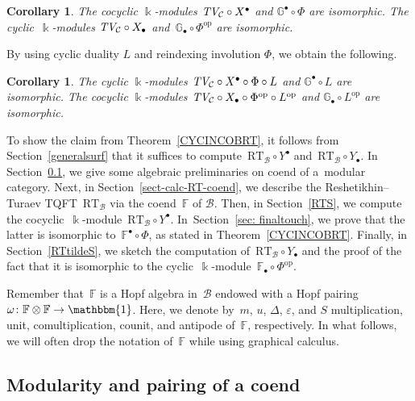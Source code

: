 \documentclass[10pt,a4paper]{amsart}
\numberwithin{equation}{section}
\newtheorem{Corollary}[Theorem]{Corollary}
\newcommand{\co}{\colon}
\newcommand{\mc}{\mathcal}
\newcommand{\opp}{\mathrm{op}}
\newcommand{\kk}{\Bbbk}
\newcommand{\uu}{\mathbbm{1}}
\newcommand{\RT}{\text{RT}}
\newcommand{\TV}{\text{TV}}
\newcommand{\coend}{\mathbb{F}}
\newcommand{\coendzc}{\mathbb{G}}
\begin{document}
\begin{Corollary}%
	The cocyclic $\kk$-modules $\emph{\TV}_{\mc C} \circ X^\bullet$ and $\coendzc^\bullet \circ \Phi$ are isomorphic. The cyclic~$\kk$-modules $\emph{\TV}_{\mc C} \circ X_\bullet$ and~$\coendzc_\bullet \circ \Phi^{\opp}$ are isomorphic.
\end{Corollary}
By using cyclic duality $L$ and reindexing involution $\Phi$, we obtain the following.

\begin{Corollary}
	The cyclic $\kk$-modules $\emph{\TV}_{\mc C} \circ X^\bullet \circ \Phi \circ L$ and $\coendzc^\bullet \circ L$ are isomorphic. The cocyclic $\kk$-modules $\emph{\TV}_{\mc C} \circ X_\bullet \circ \Phi^{\opp} \circ L^\opp$ and $\coendzc_\bullet \circ L^\opp$ are isomorphic.
\end{Corollary}

To show the claim from Theorem~\ref{CYCINCOBRT}, it follows from Section~\ref{generalsurf} that it suffices to compute~$\RT_\mc B\circ Y^\bullet$ and~$\RT_\mc B\circ Y_\bullet$. In Section~\ref{sect-modul-coend}, we give some algebraic preliminaries on coend of a~modular category. Next, in Section~\ref{sect-calc-RT-coend}, we describe the Reshetikhin--Turaev TQFT~$\RT_{\mc B}$ via the coend~$\coend$ of $\mc B$. Then, in Section~\ref{RTS}, we compute the cocyclic~$\kk$-module~$\RT_{\mc B}\circ Y^\bullet$.
In~Section~\ref{sec: finaltouch}, we prove that the latter is isomorphic to~$\coend^\bullet \circ \Phi$, as stated in Theorem~\ref{CYCINCOBRT}.
Finally, in Section~\ref{RTtildeS}, we sketch the computation of~$\RT_{\mc B}\circ Y_\bullet$ and the proof of the fact that it is isomorphic to the cyclic~$\kk$-module~$\coend_\bullet \circ \Phi^{\opp}$.

Remember that~$\coend$ is a Hopf algebra in~$\mc B$ endowed with a Hopf pairing~$\omega \co \coend \otimes \coend \to \uu$.
Here, we denote by~$m$, $u$, $\Delta$, $\varepsilon$, and $S$ multiplication, unit, comultiplication, counit, and antipode of~$\coend$, respectively. In what follows, we will often drop the notation of~$\coend$ while using graphical calculus.

\subsection{Modularity and pairing of a coend}\label{sect-modul-coend}
\end{document}
